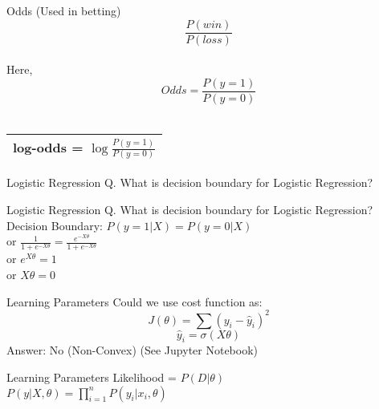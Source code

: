\documentclass{beamer}
\begin{document}
	\begin{frame}{Odds (Used in betting)}
	    $$\frac{P(win)}{P(loss)}$$ \\
	    \hspace{3cm} Here,\\
	    $$Odds = \frac{P(y = 1)}{P(y = 0)}$$ \\
	    \centering
	    \begin{tabular}{|c|} \hline
        log-odds = $\log\frac{P(y = 1)}{P(y = 0)}$  \\ \hline
        \end{tabular}
	\end{frame}
	\begin{frame}{Logistic Regression}
	    Q. What is decision boundary for Logistic Regression?
	\end{frame}
	\begin{frame}{Logistic Regression}
	    Q. What is decision boundary for Logistic Regression? \\
	    \hspace{0.4cm} Decision Boundary: $P(y = 1|X) = P(y = 0 | X)$\\
	    \vspace{0.3cm}
	    \hspace{4cm} or $\frac{1}{1 + e^{-X\theta}} = \frac{e^{-X\theta}}{1 + e^{-X\theta}}$  \\
	    \vspace{0.3cm}
	    \hspace{4cm} or $e^{X\theta} = 1$\\
	    \vspace{0.3cm}
	    \hspace{4cm} or $X\theta = 0$
	\end{frame}
	\begin{frame}{Learning Parameters}
	    Could we use cost function as:
	    \begin{equation*}
	        J(\theta) = \sum (y_{i} - \hat{y}_{i})^{2}
	    \end{equation*}
	    \begin{equation*}
	        \hat{y}_{i} = \sigma(X\theta)
	    \end{equation*}
	    Answer: No (Non-Convex)  \hspace{1.2cm} (See Jupyter Notebook)
	\end{frame}
	\begin{frame}{Learning Parameters}
	    Likelihood = $P(D | \theta)$ \\
	    \vspace{0.2cm}
	    $P(y | X, \theta) = \prod_{i=1}^{n} P(y_{i} | x_{i}, \theta)$
	\end{frame}
\end{document}
